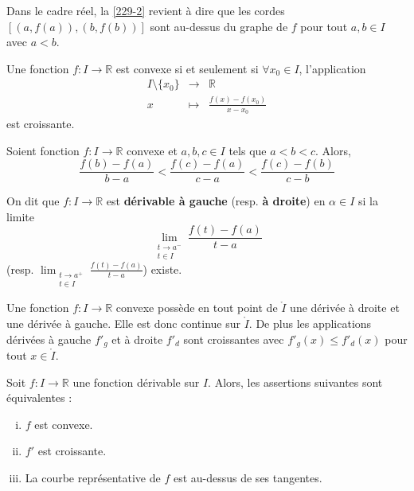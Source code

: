 
	\begin{remark}
		Dans le cadre réel, la \cref{229-2} revient à dire que les cordes $[(a, f(a)), (b, f(b))]$ sont au-dessus du graphe de $f$ pour tout $a, b \in I$ avec $a < b$.
	\end{remark}

	\begin{proposition}
		Une fonction $f : I \rightarrow \mathbb{R}$ est convexe si et seulement si $\forall x_0 \in I$, l'application
		\[
		\begin{array}{ccc}
			I \setminus \{ x_0 \} &\rightarrow& \mathbb{R} \\
			x &\mapsto& \frac{f(x) - f(x_0)}{x - x_0}
		\end{array}
		\]
		est croissante.
	\end{proposition}

	\begin{corollary}
		Soient fonction $f : I \rightarrow \mathbb{R}$ convexe et $a, b, c \in I$ tels que $a < b < c$. Alors,
		\[ \frac{f(b) - f(a)}{b-a} < \frac{f(c) - f(a)}{c-a} < \frac{f(c) - f(b)}{c-b} \]
	\end{corollary}


	\begin{definition}
		On dit que $f : I \rightarrow \mathbb{R}$ est \textbf{dérivable à gauche} (resp. \textbf{à droite}) en $\alpha \in I$ si la limite
		\[ \lim_{\substack{t \rightarrow a^{-} \\ t \in I}} \frac{f(t) - f(a)}{t-a} \]
		(resp. $\lim_{\substack{t \rightarrow a^{+} \\ t \in I}} \frac{f(t) - f(a)}{t-a}$) existe.
	\end{definition}


	\begin{proposition}
		Une fonction $f : I \rightarrow \mathbb{R}$ convexe possède en tout point de $\mathring{I}$ une dérivée à droite et une dérivée à gauche. Elle est donc continue sur $\mathring{I}$. De plus les applications dérivées à gauche $f'_g$ et à droite $f'_d$ sont croissantes avec $f'_g(x) \leq f'_d(x)$ pour tout $x \in \mathring{I}$.
	\end{proposition}

	\begin{theorem}
		Soit $f : I \rightarrow \mathbb{R}$ une fonction dérivable sur $I$. Alors, les assertions suivantes sont équivalentes :
		\begin{enumerate}[(i)]
			\item $f$ est convexe.
			\item $f'$ est croissante.
			\item La courbe représentative de $f$ est au-dessus de ses tangentes.
		\end{enumerate}
	\end{theorem}

